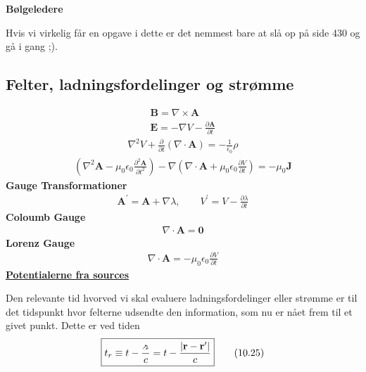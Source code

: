 \documentclass[a4paper]{article}
\begin{document}
    \textbf{Bølgeledere}
    
    Hvis vi virkelig får en opgave i dette er det nemmest bare at slå op på side 430 og gå i gang ;).

    \subsection{Felter, ladningsfordelinger og strømme}
    \begin{gather*}
        \boxed{\mathbf{B} = \nabla \times \mathbf{A}}\\
        \boxed{\mathbf{E} = - \nabla V - \frac{\partial \mathbf{A}}{\partial t} }
    \end{gather*}
    \begin{align*}
        \nabla ^{2} V + \frac{\partial}{\partial t} \left( \nabla \cdot \mathbf{A} \right) = - \frac{1}{\epsilon _0} \rho \tag{10.4}
    \end{align*} 
    \begin{align*}
       \left( \nabla^2 \mathbf{A} - \mu_0 \epsilon_0 \frac{\partial^2 \mathbf{A}}{\partial t^2} \right)
        - \nabla \left( \nabla \cdot \mathbf{A} + \mu_0 \epsilon_0 \frac{\partial V}{\partial t} \right)
        = -\mu_0 \mathbf{J} \tag{10.5}
    \end{align*}
    \textbf{Gauge Transformationer}
    \begin{align*}
        \boxed{\mathbf{A}^{\prime}  = \mathbf{A} + \nabla \lambda, \qquad V^{\prime}  = V - \frac{\partial \lambda }{\partial t}} \tag{10.7}
    \end{align*} 
    \textbf{Coloumb Gauge}
    \begin{align*}
        \nabla \cdot \mathbf{A} = \mathbf{0} \tag{10.8}
    \end{align*} 
    \textbf{Lorenz Gauge}
    \begin{align*}
        \nabla \cdot \mathbf{A} = - \mu _0 \epsilon _0 \frac{\partial V}{\partial t}\tag{10.12}
    \end{align*} 
    \underline{\textbf{Potentialerne fra sources}}

    Den relevante tid hvorved vi skal evaluere ladningsfordelinger eller strømme er til det tidspunkt hvor felterne udsendte den information, som nu er nået frem til et givet punkt. Dette er ved tiden \begin{align*}
        \boxed{t_r \equiv t - \frac{\griffr[2] }{c} = t - \frac{\left| \mathbf{r} - \mathbf{r}^{\prime}  \right| }{c}} \tag{10.25}
    \end{align*}
\end{document}
